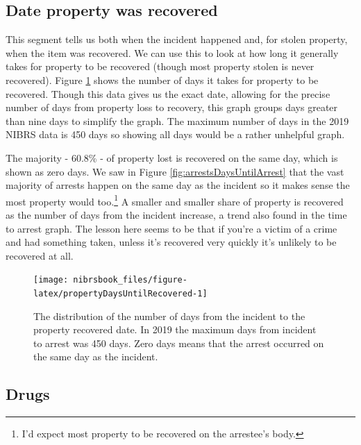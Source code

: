 \documentclass[
  12pt,
  openany]{book}
\begin{document}
\hypertarget{date-property-was-recovered}{%
\subsection{Date property was recovered}\label{date-property-was-recovered}}

This segment tells us both when the incident happened and, for stolen property, when the item was recovered. We can use this to look at how long it generally takes for property to be recovered (though most property stolen is never recovered). Figure \ref{fig:propertyDaysUntilRecovered} shows the number of days it takes for property to be recovered. Though this data gives us the exact date, allowing for the precise number of days from property loss to recovery, this graph groups days greater than nine days to simplify the graph. The maximum number of days in the 2019 NIBRS data is 450 days so showing all days would be a rather unhelpful graph.

The majority - 60.8\% - of property lost is recovered on the same day, which is shown as zero days. We saw in Figure \ref{fig:arrestsDaysUntilArrest} that the vast majority of arrests happen on the same day as the incident so it makes sense the most property would too.\footnote{I'd expect most property to be recovered on the arrestee's body.} A smaller and smaller share of property is recovered as the number of days from the incident increase, a trend also found in the time to arrest graph. The lesson here seems to be that if you're a victim of a crime and had something taken, unless it's recovered very quickly it's unlikely to be recovered at all.

\begin{figure}

{\centering \texttt{[image: nibrsbook\_files/figure-latex/propertyDaysUntilRecovered-1]} 

}

\caption{The distribution of the number of days from the incident to the property recovered date. In 2019 the maximum days from incident to arrest was 450 days. Zero days means that the arrest occurred on the same day as the incident. }\label{fig:propertyDaysUntilRecovered}
\end{figure}

\hypertarget{drugs}{%
\subsection{Drugs}\label{drugs}}
\end{document}
